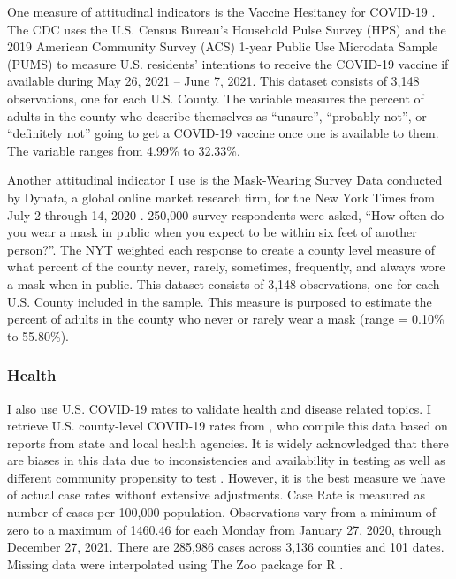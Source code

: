

One measure of attitudinal indicators is the Vaccine Hesitancy for COVID-19
\citep{vaches_data}. The CDC uses the U.S. Census Bureau’s Household Pulse
Survey (HPS) and the 2019 American Community Survey (ACS) 1-year Public Use
Microdata Sample (PUMS) to measure U.S. residents’ intentions to receive the
COVID-19 vaccine if available during May 26, 2021 – June 7, 2021. This dataset
consists of 3,148 observations, one for each U.S. County. The variable measures
the percent of adults in the county who describe themselves as ``unsure'',
``probably not'', or ``definitely not'' going to get a COVID-19 vaccine once one is
available to them. The variable ranges from 4.99\% to 32.33\%.

Another attitudinal indicator I use is the Mask-Wearing Survey Data conducted by
Dynata, a global online market research firm, for the New York Times from July 2
through 14, 2020 \citep{mask_data}. 250,000 survey respondents were asked, ``How
often do you wear a mask in public when you expect to be within six feet of
another person?''. The NYT weighted each response to create a county level
measure of what percent of the county never, rarely, sometimes, frequently, and
always wore a mask when in public. This dataset consists of 3,148 observations,
one for each U.S. County included in the sample. This measure is purposed to
estimate the percent of adults in the county who never or rarely wear a mask
(range = 0.10\% to 55.80\%).

\subsubsection{Health}

I also use U.S. COVID-19 rates to validate health and disease related topics. I
retrieve U.S. county-level COVID-19 rates from \citet{covid_data}, who compile
this data based on reports from state and local health agencies. It is widely
acknowledged that there are biases in this data due to inconsistencies and
availability in testing as well as different community propensity to test \citep{gu22, cdc20a}.
However, it is the best measure we have of
actual case rates without extensive adjustments. Case Rate is measured as number
of cases per 100,000 population. Observations vary from a minimum of zero to a
maximum of 1460.46 for each Monday from January 27, 2020, through December 27,
2021. There are 285,986 cases across 3,136 counties and 101 dates. Missing data
were interpolated using The Zoo package for R \citep{zoo}.

